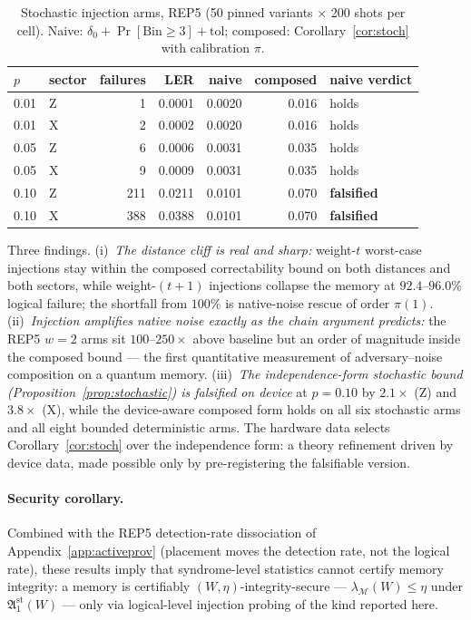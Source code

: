 \documentclass[11pt,a4paper]{article}
\begin{document}
\begin{table}[H]\centering\small
\caption{Stochastic injection arms, REP5 (50 pinned variants $\times$ 200
shots per cell). Naive: $\delta_0+\Pr[\mathrm{Bin}\ge3]+\mathrm{tol}$;
composed: Corollary~\ref{cor:stoch} with calibration $\pi$.}
\label{tab:injstoch}
\begin{tabular}{@{}llrrrrl@{}}
\toprule
$p$ & sector & failures & LER & naive & composed & naive verdict \\\midrule
0.01 & Z & 1 & 0.0001 & 0.0020 & 0.016 & holds \\
0.01 & X & 2 & 0.0002 & 0.0020 & 0.016 & holds \\
0.05 & Z & 6 & 0.0006 & 0.0031 & 0.035 & holds \\
0.05 & X & 9 & 0.0009 & 0.0031 & 0.035 & holds \\
0.10 & Z & 211 & 0.0211 & 0.0101 & 0.070 & \textbf{falsified} \\
0.10 & X & 388 & 0.0388 & 0.0101 & 0.070 & \textbf{falsified} \\\bottomrule
\end{tabular}
\end{table}

Three findings. (i)~\emph{The distance cliff is real and sharp:}
weight-$t$ worst-case injections stay within the composed
correctability bound on both distances and both sectors, while
weight-$(t{+}1)$ injections collapse the memory at $92.4$--$96.0\%$
logical failure; the shortfall from $100\%$ is native-noise rescue of
order $\pi(1)$. (ii)~\emph{Injection amplifies native noise exactly as
the chain argument predicts:} the REP5 $w{=}2$ arms sit
$100$--$250\times$ above baseline but an order of magnitude inside the
composed bound --- the first quantitative measurement of
adversary--noise composition on a quantum memory.
(iii)~\emph{The independence-form stochastic bound
(Proposition~\ref{prop:stochastic}) is falsified on device} at
$p{=}0.10$ by $2.1\times$ (Z) and $3.8\times$ (X), while the
device-aware composed form holds on all six stochastic arms and all
eight bounded deterministic arms. The hardware data selects
Corollary~\ref{cor:stoch} over the independence form: a theory
refinement driven by device data, made possible only by pre-registering
the falsifiable version.

\paragraph{Security corollary.}
Combined with the REP5 detection-rate dissociation of
Appendix~\ref{app:activeprov} (placement moves the detection rate, not
the logical rate), these results imply that syndrome-level statistics
cannot certify memory integrity: a memory is certifiably
$(W,\eta)$-integrity-secure --- $\lambda_{\mathcal{M}}(W)\le\eta$ under
$\mathfrak{A}_1^{\mathrm{st}}(W)$ --- only via logical-level injection
probing of the kind reported here.
\end{document}
